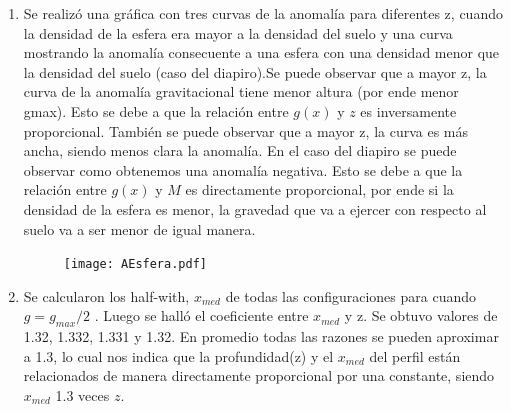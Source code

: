 \documentclass{article}
\begin{document}
\begin{enumerate}
\begin{enumerate}
	\item Se realiz\'o una gr\'afica con tres curvas de la anomal\'ia para diferentes z, cuando la densidad de la esfera era mayor a la densidad del suelo y una curva mostrando la anomal\'ia consecuente a una esfera con una densidad menor que la densidad del suelo (caso del diapiro).Se puede observar que a mayor z, la curva de la anomal\'ia gravitacional tiene menor altura (por ende menor gmax). Esto se debe a que la relaci\'on entre $g(x)$ y $z$ es inversamente proporcional. Tambi\'en se puede observar que a mayor z, la curva es m\'as ancha, siendo menos clara la anomal\'ia. En el caso del diapiro se puede observar como obtenemos una anomal\'ia negativa. Esto se debe a que la relaci\'on entre $g(x)$ y $M$ es directamente proporcional, por ende si la densidad de la esfera es menor, la gravedad que va a ejercer con respecto al suelo va a ser menor de igual manera.
	\begin{figure}[H]\centering 
	\texttt{[image: AEsfera.pdf]}
	\end{figure}
	\item Se calcularon los half-with, $x_{med}$ de todas las configuraciones para cuando $g = g_{max}/2$ . Luego se hall\'o el coeficiente entre $x_{med}$ y z. Se obtuvo valores de 1.32, 1.332, 1.331 y 1.32. En promedio todas las razones se pueden aproximar a 1.3, lo cual nos indica que la profundidad(z) y el $x_{med}$ del perfil est\'an relacionados de manera directamente proporcional por una constante, siendo $x_{med}$ 1.3 veces $z$.
	\end{enumerate}


\end{enumerate}
\end{document}
